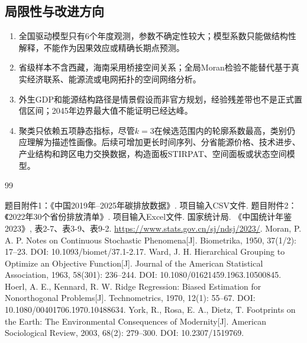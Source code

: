 \documentclass[12pt,a4paper]{ctexart}
\renewcommand{\thesection}{\chinese{section}、}
\renewcommand{\thesubsection}{\arabic{section}.\arabic{subsection}}
\renewcommand{\thesubsubsection}{\arabic{section}.\arabic{subsection}.\arabic{subsubsection}}
\theoremstyle{definition}
\theoremstyle{plain}
\theoremstyle{remark}
\begin{document}
\subsection{局限性与改进方向}
\begin{enumerate}[label=(\arabic*)]
\item 全国驱动模型只有6个年度观测，参数不确定性较大；模型系数只能做结构性解释，不能作为因果效应或精确长期点预测。
\item 省级样本不含西藏，海南采用桥接空间关系；全局Moran检验不能替代基于真实经济联系、能源流或电网拓扑的空间网络分析。
\item 外生GDP和能源结构路径是情景假设而非官方规划，经验残差带也不是正式置信区间；2045年边界最大值不能证明已经达峰。
\item 聚类只依赖五项静态指标，尽管$k=3$在候选范围内的轮廓系数最高，类别仍应理解为描述性画像。后续可增加更长时间序列、分省能源价格、技术进步、产业结构和跨区电力交换数据，构造面板STIRPAT、空间面板或状态空间模型。
\end{enumerate}

\newpage
\begin{thebibliography}{99}
\raggedright
{}
 题目附件1：《中国2019年--2025年碳排放数据》. 项目输入CSV文件.
 题目附件2：《2022年30个省份排放清单》. 项目输入Excel文件.
 国家统计局. 《中国统计年鉴2023》, 表2-7、表3-9、表9-2. \url{https://www.stats.gov.cn/sj/ndsj/2023/}.
 Moran, P. A. P. Notes on Continuous Stochastic Phenomena[J]. Biometrika, 1950, 37(1/2): 17--23. DOI: 10.1093/biomet/37.1-2.17.
 Ward, J. H. Hierarchical Grouping to Optimize an Objective Function[J]. Journal of the American Statistical Association, 1963, 58(301): 236--244. DOI: 10.1080/01621459.1963.10500845.
 Hoerl, A. E., Kennard, R. W. Ridge Regression: Biased Estimation for Nonorthogonal Problems[J]. Technometrics, 1970, 12(1): 55--67. DOI: 10.1080/00401706.1970.10488634.
 York, R., Rosa, E. A., Dietz, T. Footprints on the Earth: The Environmental Consequences of Modernity[J]. American Sociological Review, 2003, 68(2): 279--300. DOI: 10.2307/1519769.

\end{thebibliography}

\newpage
\appendix
\renewcommand{\thesection}{附录 \Alph{section}}
\renewcommand{\thesubsection}{\Alph{section}.\arabic{subsection}}
\renewcommand{\thesubsubsection}{\Alph{section}.\arabic{subsection}.\arabic{subsubsection}}
\titleformat{\section}{\centering\heiti\zihao{-3}\bfseries}{\thesection}{1em}{}
\end{document}
